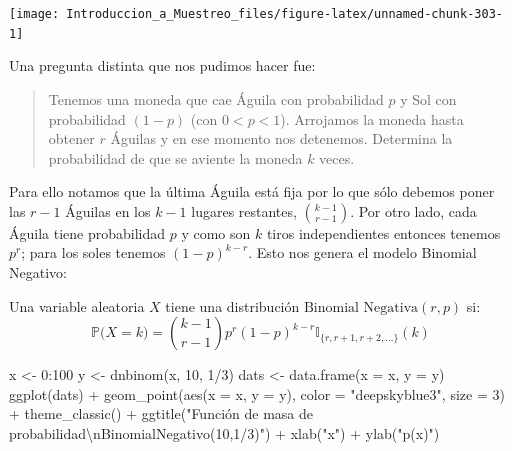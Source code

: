 \documentclass[
]{book}
\newenvironment{Shaded}{\begin{snugshade}}{\end{snugshade}}
\newcommand{\AttributeTok}[1]{\textcolor[rgb]{0.77,0.63,0.00}{#1}}
\newcommand{\DecValTok}[1]{\textcolor[rgb]{0.00,0.00,0.81}{#1}}
\newcommand{\FunctionTok}[1]{\textcolor[rgb]{0.00,0.00,0.00}{#1}}
\newcommand{\NormalTok}[1]{#1}
\newcommand{\OtherTok}[1]{\textcolor[rgb]{0.56,0.35,0.01}{#1}}
\newcommand{\SpecialCharTok}[1]{\textcolor[rgb]{0.00,0.00,0.00}{#1}}
\newcommand{\StringTok}[1]{\textcolor[rgb]{0.31,0.60,0.02}{#1}}
\begin{document}
\begin{center}\texttt{[image: Introduccion\_a\_Muestreo\_files/figure-latex/unnamed-chunk-303-1]} \end{center}

Una pregunta distinta que nos pudimos hacer fue:

\begin{quote}
Tenemos una moneda que cae Águila con probabilidad \(p\) y Sol con probabilidad \((1-p)\) (con \(0 < p < 1\)). Arrojamos la moneda hasta obtener \(r\) Águilas y en ese momento nos detenemos. Determina la probabilidad de que se aviente la moneda \(k\) veces.
\end{quote}

Para ello notamos que la última Águila está fija por lo que sólo debemos poner las \(r-1\) Águilas en los \(k-1\) lugares restantes, \(\binom{k-1}{r-1}\). Por otro lado, cada Águila tiene probabilidad \(p\) y como son \(k\) tiros independientes entonces tenemos \(p^r\); para los soles tenemos \((1-p)^{k-r}\). Esto nos genera el modelo Binomial Negativo:

Una variable aleatoria \(X\) tiene una distribución \(\text{Binomial Negativa}(r,p)\) si:
\[
\mathbb{P}\big(X = k \big) = \binom{k-1}{r-1} p^r (1-p)^{k-r} \mathbb{I}_{\{r, r+1, r+2, \dots \}}(k)
\]

\begin{Shaded}
\begin{Highlighting}[]
\NormalTok{x }\OtherTok{\textless{}{-}} \DecValTok{0}\SpecialCharTok{:}\DecValTok{100}
\NormalTok{y }\OtherTok{\textless{}{-}} \FunctionTok{dnbinom}\NormalTok{(x, }\DecValTok{10}\NormalTok{, }\DecValTok{1}\SpecialCharTok{/}\DecValTok{3}\NormalTok{)}
\NormalTok{dats }\OtherTok{\textless{}{-}} \FunctionTok{data.frame}\NormalTok{(}\AttributeTok{x =}\NormalTok{ x, }\AttributeTok{y =}\NormalTok{ y)}
\FunctionTok{ggplot}\NormalTok{(dats) }\SpecialCharTok{+} \FunctionTok{geom\_point}\NormalTok{(}\FunctionTok{aes}\NormalTok{(}\AttributeTok{x =}\NormalTok{ x, }\AttributeTok{y =}\NormalTok{ y), }\AttributeTok{color =} \StringTok{"deepskyblue3"}\NormalTok{, }\AttributeTok{size =} \DecValTok{3}\NormalTok{) }\SpecialCharTok{+} \FunctionTok{theme\_classic}\NormalTok{() }\SpecialCharTok{+} \FunctionTok{ggtitle}\NormalTok{(}\StringTok{"Función de masa de probabilidad}\SpecialCharTok{\textbackslash{}n}\StringTok{BinomialNegativo(10,1/3)"}\NormalTok{) }\SpecialCharTok{+}
  \FunctionTok{xlab}\NormalTok{(}\StringTok{"x"}\NormalTok{) }\SpecialCharTok{+} \FunctionTok{ylab}\NormalTok{(}\StringTok{"p(x)"}\NormalTok{)}
\end{Highlighting}
\end{Shaded}
\end{document}
